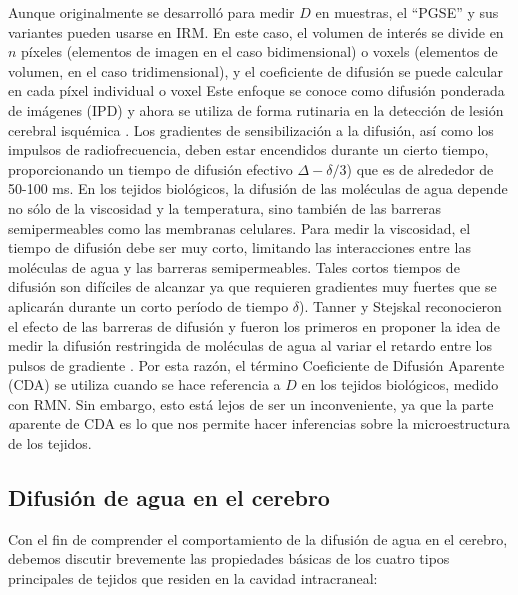 Aunque originalmente se desarrolló para medir $D$ en muestras, el ``PGSE'' y sus variantes pueden usarse en IRM. En este caso, el volumen de interés se divide en $n$ píxeles (elementos de imagen en el caso bidimensional) o voxels (elementos de volumen, en el caso tridimensional), y el coeficiente de difusión se puede calcular en cada píxel individual o voxel Este enfoque se conoce como difusión ponderada de imágenes (IPD) \cite{Wesbey_1984} y ahora se utiliza de forma rutinaria en la detección de lesión cerebral isquémica \cite{Sotak_2002}. Los gradientes de sensibilización a la difusión, así como los impulsos de radiofrecuencia, deben estar encendidos durante un cierto tiempo, proporcionando un tiempo de difusión efectivo $\Delta - \delta/3$) que es de alrededor de 50-100 ms. En los tejidos biológicos, la difusión de las moléculas de agua depende no sólo de la viscosidad y la temperatura, sino también de las barreras semipermeables como las membranas celulares. Para medir la viscosidad, el tiempo de difusión debe ser muy corto, limitando las interacciones entre las moléculas de agua y las barreras semipermeables. Tales cortos tiempos de difusión son difíciles de alcanzar ya que requieren gradientes muy fuertes que se aplicarán durante un corto período de tiempo \(\delta\)). Tanner y Stejskal reconocieron el efecto de las barreras de difusión y fueron los primeros en proponer la idea de medir la difusión restringida de moléculas de agua al variar el retardo entre los pulsos de gradiente \cite{Tanner_1968}. Por esta razón, el término Coeficiente de Difusión Aparente (CDA) se utiliza cuando se hace referencia a $D$ en los tejidos biológicos, medido con RMN. Sin embargo, esto está lejos de ser un inconveniente, ya que la parte {\emph aparente} de CDA es lo que nos permite hacer inferencias sobre la microestructura de los tejidos.

\subsection{Difusión de agua en el cerebro}

Con el fin de comprender el comportamiento de la difusión de agua en el cerebro, debemos discutir brevemente las propiedades básicas de los cuatro tipos principales de tejidos que residen en la cavidad intracraneal:

